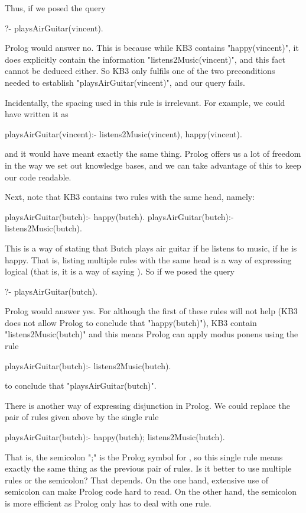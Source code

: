 Thus, if we posed the query
\begin{LPNcodedisplay}
?- playsAirGuitar(vincent).
\end{LPNcodedisplay}
Prolog would answer no.  This is because while KB3 contains
"happy(vincent)", it does  explicitly contain the
information "listens2Music(vincent)", and this fact cannot be deduced
either.  So KB3 only fulfils one of the two preconditions needed to
establish "playsAirGuitar(vincent)", and our query fails.

Incidentally, the spacing used in this rule is irrelevant. For
example, we could have written it as
\begin{LPNcodedisplay}
playsAirGuitar(vincent):- listens2Music(vincent),
			   happy(vincent).
\end{LPNcodedisplay}
and it would have meant exactly the same thing. Prolog offers us a lot
of freedom in the way we set out knowledge bases, and we can take
advantage of this to keep our code readable.

Next, note that KB3 contains two rules with  the same
head, namely:
\begin{LPNcodedisplay}
playsAirGuitar(butch):-
   happy(butch).
playsAirGuitar(butch):-
   listens2Music(butch).
\end{LPNcodedisplay}
This is a way of stating that Butch plays air guitar
 if he listens to music,  if he is happy.
That is, listing multiple rules with the same head is a way of
expressing logical  (that is, it is a way of
saying ).  So if we posed the query
\begin{LPNcodedisplay}
?- playsAirGuitar(butch).
\end{LPNcodedisplay}
Prolog would answer yes. For although the first of these rules
will not help (KB3 does not allow Prolog to conclude that
"happy(butch)"), KB3  contain "listens2Music(butch)"
and this means Prolog can apply modus ponens using the rule
\begin{LPNcodedisplay}
playsAirGuitar(butch):-
   listens2Music(butch).
\end{LPNcodedisplay}
to conclude that "playsAirGuitar(butch)".

There is another way of expressing disjunction in Prolog. We could
replace the pair of rules given above by the single rule
\begin{LPNcodedisplay}
playsAirGuitar(butch):-
   happy(butch);
   listens2Music(butch).
\end{LPNcodedisplay}
That is, the semicolon ";" is the Prolog symbol for , so
this single rule means exactly the same thing as the previous pair of
rules. Is it better to use multiple rules or the semicolon?  That
depends. On the one hand, extensive use of semicolon can make Prolog
code hard to read. On the other hand, the semicolon is more efficient
as Prolog only has to deal with one rule.

